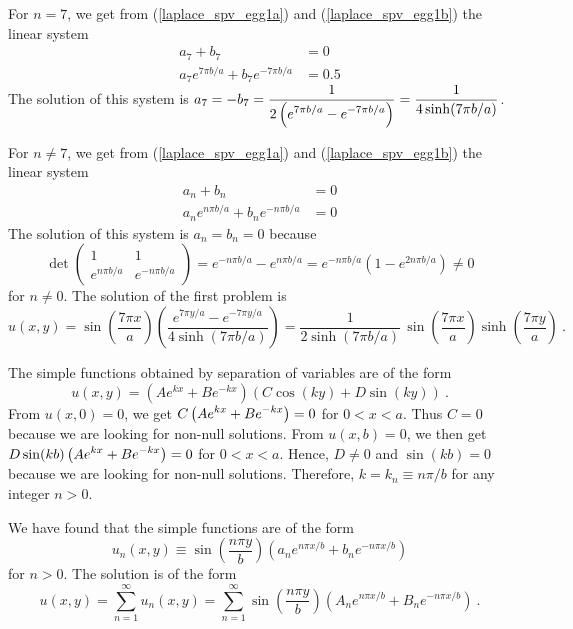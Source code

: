 \begin{egg}
For $n=7$, we get from (\ref{laplace_spv_egg1a}) and
(\ref{laplace_spv_egg1b}) the linear system
\begin{align*}
a_7 + b_7 &= 0 \\
a_7 e^{7\pi b/a} + b_7 e^{-7\pi b/a} &= 0.5
\end{align*}
The solution of this system is
$\displaystyle
a_7 = -b_7 =\frac{1}{\displaystyle 2\left( e^{7\pi b/a} - e^{-7\pi b/a}\right)}
= \frac{1}{4 \sinh(7\pi b/a)}$.

For $n\neq 7$, we get from (\ref{laplace_spv_egg1a}) and
(\ref{laplace_spv_egg1b}) the linear system
\begin{align*}
a_n + b_n &= 0 \\
a_n e^{n\pi b/a} + b_n e^{-n\pi b/a} &= 0
\end{align*}
The solution of this system is $a_n = b_n = 0$ because
\[
\det
\begin{pmatrix}
1 & 1 \\
e^{n\pi b/a} & e^{-n\pi b/a}
\end{pmatrix}
= e^{-n\pi b/a}-e^{n\pi b/a} =
e^{-n\pi b/a} \left( 1 - e^{2n\pi b/a}\right) \neq 0
\]
for $n\neq 0$.  The solution of the first problem is
\begin{equation} \label{laplace_spv_egg1c}
u(x,y) = \sin\left(\frac{7\pi x}{a}\right)
\left(\frac{e^{7\pi y/a} - e^{-7\pi y/a}}{4 \sinh(7\pi b/a)} \right)
= \frac{1}{2 \sinh(7\pi b/a)}\, \sin\left(\frac{7\pi x}{a}\right)
\sinh\left(\frac{7\pi y}{a}\right) \ .
\end{equation}

The simple functions obtained by separation of variables are of the
form
\[
u(x,y) = \left( A e^{kx} + B e^{-kx} \right)
\left(C \cos(ky) + D \sin(ky)\right) \  .
\]
From $u(x,0) = 0$, we get
$\displaystyle C \left(A e^{kx} + B e^{-kx}\right)=0$ for
$0<x<a$.  Thus $C=0$ because we are looking for non-null solutions.
From $u(x,b) = 0$, we then get
$\displaystyle D\sin(kb)\left(A e^{kx} + B e^{-kx}\right)=0$ for
$0<x<a$.  Hence, $D \neq 0$ and $\sin(kb)=0$ because we are looking
for non-null solutions.  Therefore, $k = k_n \equiv n\pi/b$ for any
integer $n>0$.

We have found that the simple functions are of the form
\[
u_n(x,y) \equiv \sin\left(\frac{n\pi y}{b}\right)
\left(a_n e^{n\pi x/b} + b_n e^{-n\pi x/b}\right)
\]
for $n > 0$.  The solution is of the form
\[
u(x,y) = \sum_{n=1}^\infty u_n(x,y) = 
\sum_{n=1}^\infty \sin\left(\frac{n\pi y}{b}\right)
\left(A_n e^{n\pi x/b} + B_n e^{-n\pi x/b}\right) \ .
\]


\end{egg}
